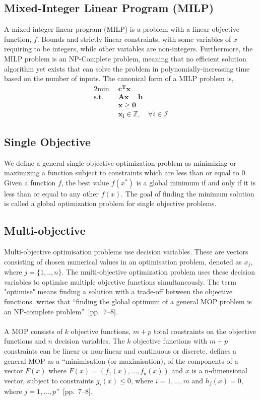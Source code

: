 \documentclass[mscthesis, 11pt]{usiinfthesis}
\theoremstyle{newdefinition}
\begin{document}
\subsection{Mixed-Integer Linear Program (MILP)}
A mixed-integer linear program (MILP) is a problem with a linear objective function, $f$. Bounds and strictly linear constraints, with some variables of $x$ requiring to be integers, while other variables are non-integers. Furthermore, the MILP problem is an NP-Complete problem, meaning that no efficient solution algorithm yet exists that can solve the problem in polynomially-increasing time based on the number of inputs. The canonical form of a MILP problem is,
\begin{alignat*}{2}
    \text{min} \enspace &\mathbf{c^T x} \\
    \text{s.t.} \enspace
     &\mathbf{Ax} = \mathbf{b} \\
     &\mathbf{x} \geq \mathbf{0} \\
     &\mathbf{x_i} \in \mathbb{Z}, \quad \forall i \in \mathcal{I}
\end{alignat*}

\subsection{Single Objective}
We define a general single objective optimization problem as minimizing or maximizing a function subject to constraints which are less than or equal to 0. Given a function $f$, the best value $f(x^*)$ is a global minimum if and only if it is less than or equal to any other $f(x)$. The goal of finding the minimum solution is called a global optimization problem for single objective problems. \cite{back_evolutionary_1996}
\subsection{Multi-objective}
Multi-objective optimisation problems use decision variables. These are vectors consisting of chosen numerical values in an optimisation problem, denoted as $x_j$, where $j = \{1,..,n\}$.  The multi-objective optimization problem uses these decision variables to optimise multiple objective functions simultaneously. The term "optimise" means finding a solution with a trade-off between the objective functions. \cite{coello_coello_basic_2007} writes that ``finding the global optimum of a general MOP problem is an NP-complete problem''~[pp.~7--8]. \\
\\
A MOP consists of $k$ objective functions, $m + p$ total constraints on the objective functions and $n$ decision variables. The $k$ objective functions with $m + p$ constraints can be linear or non-linear and continuous or discrete. \cite{coello_coello_basic_2007} defines a general MOP as a ``minimisation (or maximisation), of the components of a vector $F(x)$ where $F(x) = (f_1(x), ..., f_k(x))$ and $x$ is a n-dimensional vector, subject to constraints $g_i(x) \leq 0$, where $i = {1,...,m}$ and $h_j(x) = 0$, where $j = {1,...,p}$''~[pp.~7--8]. 
\clearpage
\end{document}
